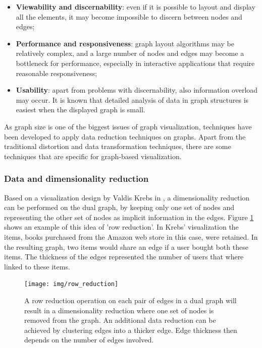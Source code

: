 \begin{itemize}
	\item \textbf{Viewability and discernability}: even if it is possible to layout and display all the elements, it may become impossible to discern between nodes and edges;
	\item \textbf{Performance and responsiveness}: graph layout algorithms may be relatively complex, and a large number of nodes and edges may become a bottleneck for performance, especially in interactive applications that require reasonable responsiveness;
	\item \textbf{Usability}: apart from problems with discernability, also information overload may occur. It is known that detailed analysis of data in graph structures is easiest when the displayed graph is small.
\end{itemize}


As graph size is one of the biggest issues of graph visualization, techniques have been developed to apply data reduction techniques on graphs\cite{herman:2000, shirley:2009}. Apart from the traditional distortion and data transformation techniques, there are some techniques that are specific for graph-based visualization.

\subsubsection{Data and dimensionality reduction}

Based on a visualization design by Valdis Krebs in \cite{steele:2010}, a dimensionality reduction can be performed on the dual graph, by keeping only one set of nodes and representing the other set of nodes as implicit information in the edges. Figure \ref{figure:rowreduction} shows an example of this idea of 'row reduction'. In Krebs' visualization the items, books purchased from the Amazon web store in this case, were retained. In the resulting graph, two items would share an edge if a user bought both these items. The thickness of the edges represented the number of users that where linked to these items\cite{krebs:2012:networkthinkers, steele:2010}.

\begin{figure}%
	\begin{center}
		\texttt{[image: img/row\_reduction]}%
	\end{center}
	\caption{A row reduction operation on each pair of edges in a dual graph will result in a dimensionality reduction where one set of nodes is removed from the graph. An additional data reduction can be achieved by clustering edges into a thicker edge. Edge thickness then depends on the number of edges involved.}%
	\label{figure:rowreduction}%
\end{figure}

